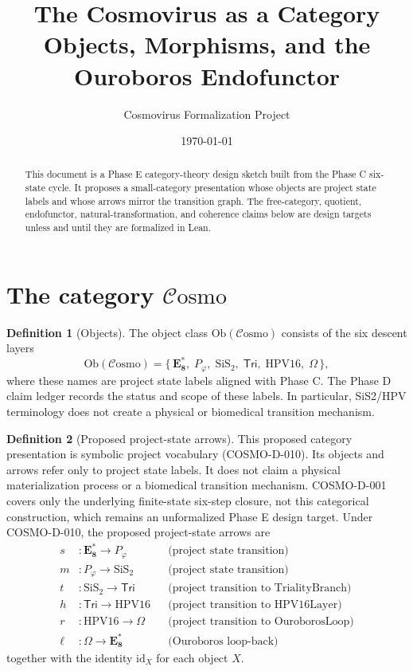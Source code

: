\documentclass[11pt]{article}
\title{\textbf{The Cosmovirus as a Category}\\[4pt]
       \large Objects, Morphisms, and the Ouroboros Endofunctor}
\author{Cosmovirus Formalization Project}
\date{\today}
\theoremstyle{definition}
\newtheorem{definition}{Definition}[section]
\theoremstyle{plain}
\theoremstyle{remark}
\newcommand{\cat}[1]{\mathcal{#1}}
\newcommand{\Cosmo}{\cat{C}\mathrm{osmo}}
\newcommand{\id}{\mathrm{id}}
\newcommand{\EEs}{\mathbf{E_8^{*}}}
\newcommand{\SiS}{\mathrm{SiS_2}}
\newcommand{\HPV}{\mathrm{HPV16}}
\newcommand{\phigr}{\varphi}
\begin{document}
\maketitle

\begin{abstract}
This document is a Phase E category-theory design sketch built from the
Phase C six-state cycle. It proposes a small-category presentation whose
objects are project state labels and whose arrows mirror the transition graph.
The free-category, quotient, endofunctor, natural-transformation, and coherence
claims below are design targets unless and until they are formalized in Lean.
\end{abstract}

\section{The category $\Cosmo$}

\begin{definition}[Objects]
The object class $\mathrm{Ob}(\Cosmo)$ consists of the six descent layers
\[
  \mathrm{Ob}(\Cosmo)=\{\,
  \EEs,\; P_\phigr,\; \SiS,\; \mathsf{Tri},\; \HPV,\; \Omega \,\},
\]
where these names are project state labels aligned with Phase C. The Phase D
claim ledger records the status and scope of these labels. In particular,
SiS2/HPV terminology does not create a physical or biomedical transition
mechanism.
\end{definition}

\begin{definition}[Proposed project-state arrows]
This proposed category presentation is symbolic project vocabulary
(COSMO-D-010). Its objects and arrows refer only to project state labels.
It does not claim a physical materialization process or a biomedical
transition mechanism. COSMO-D-001 covers only the underlying finite-state
six-step closure, not this categorical construction, which remains an
unformalized Phase E design target. Under COSMO-D-010, the proposed project-state arrows are
\[
\begin{aligned}
  s &: \EEs \to P_\phigr        &&\text{(project state transition)}\\
  m &: P_\phigr \to \SiS        &&\text{(project state transition)}\\
  t &: \SiS \to \mathsf{Tri}    &&\text{(project transition to TrialityBranch)}\\
  h &: \mathsf{Tri} \to \HPV    &&\text{(project transition to HPV16Layer)}\\
  r &: \HPV \to \Omega          &&\text{(project transition to OuroborosLoop)}\\
  \ell &: \Omega \to \EEs       &&\text{(Ouroboros loop-back)}
\end{aligned}
\]
together with the identity $\id_X$ for each object $X$.
\end{definition}
\end{document}
